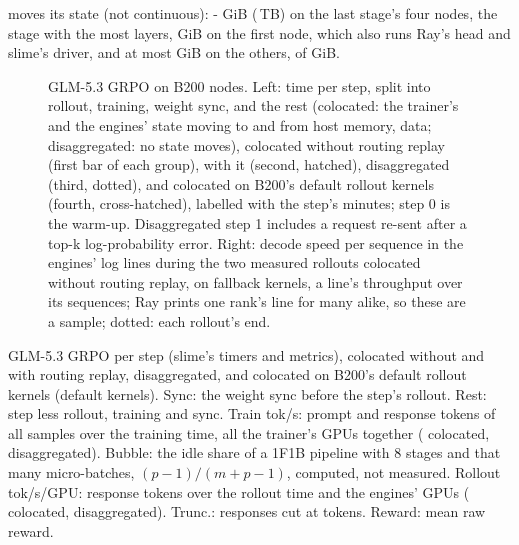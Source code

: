 moves its state (not continuous): \TriGrHostLastLo-\TriGrHostLastHi{} GiB (\TriGrHostLastTb\,TB) on the last stage's four nodes, the stage with the most layers, \TriGrHostFirst{} GiB on the first node, which also runs Ray's head and slime's driver, and at most \TriGrHostOtherHi{} GiB on the others, of \TriGrHostTotal{} GiB.

\begin{figure}[h]
  \centering{}
  \caption{GLM-5.3 GRPO on \TriGrNodes{} B200 nodes. Left: time per step, split into rollout, training, weight sync, and the rest (colocated: the trainer's and the engines' state moving to and from host memory, data; disaggregated: no state moves), colocated without routing replay (first bar of each group), with it (second, hatched), disaggregated (third, dotted), and colocated on B200's default rollout kernels (fourth, cross-hatched), labelled with the step's minutes; step 0 is the warm-up. Disaggregated step 1 includes a request re-sent after a top-k log-probability error. Right: decode speed per sequence in the engines' log lines during the two measured rollouts colocated without routing replay, on fallback kernels, a line's throughput over its sequences; Ray prints one rank's line for many alike, so these are a sample; dotted: each rollout's end.}
  \label{fig:glm_rl}
\end{figure}

\begin{table}[h]
  \caption{GLM-5.3 GRPO per step (slime's timers and metrics), colocated without and with routing replay, disaggregated, and colocated on B200's default rollout kernels (default kernels). Sync: the weight sync before the step's rollout. Rest: step less rollout, training and sync. Train tok/s: prompt and response tokens of all samples over the training time, all the trainer's GPUs together (\TriGrGpus{} colocated, \TriGrDgTrainerGpus{} disaggregated). Bubble: the idle share of a 1F1B pipeline with 8 stages and that many micro-batches, $(p-1)/(m+p-1)$, computed, not measured. Rollout tok/s/GPU: response tokens over the rollout time and the engines' GPUs (\TriGrGpus{} colocated, \TriGrDgEngineGpus{} disaggregated). Trunc.: responses cut at \TriGrMaxResp{} tokens. Reward: mean raw reward.}
  \label{tab:glm_rl_steps}
  \centering\scriptsize
  \begin{adjustbox}{max width=\linewidth}
  \end{adjustbox}
\end{table}

